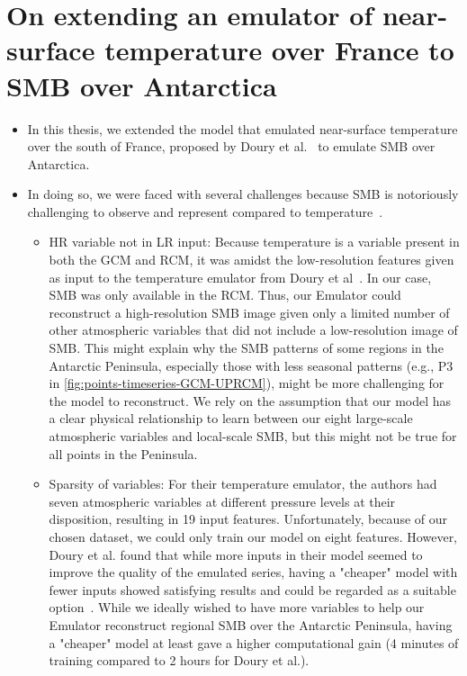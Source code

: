 \documentclass[a4paper,11pt,oneside]{report}
\begin{document}
\section{On extending an emulator of near-surface temperature over France to SMB over Antarctica}\label{sec:extension-doury}
\begin{itemize}
    \item In this thesis, we extended the model that emulated near-surface temperature over the south of France, proposed by Doury et al.~\cite{Doury} to emulate SMB over Antarctica. 
    \item In doing so, we were faced with several challenges because SMB is notoriously challenging to observe and represent compared to temperature~\cite{Lenaerts2019}. 
    \begin{itemize}
        \item HR variable not in LR input: Because temperature is a variable present in both the GCM and RCM, it was amidst the low-resolution features given as input to the temperature emulator from Doury et al~\cite{Doury}. In our case, SMB was only available in the RCM. Thus, our Emulator could reconstruct a high-resolution SMB image given only a limited number of other atmospheric variables that did not include a low-resolution image of SMB. This might explain why the SMB patterns of some regions in the Antarctic Peninsula, especially those with less seasonal patterns (e.g., P3 in \autoref{fig:points-timeseries-GCM-UPRCM}), might be more challenging for the model to reconstruct. We rely on the assumption that our model has a clear physical relationship to learn between our eight large-scale atmospheric variables and local-scale SMB, but this might not be true for all points in the Peninsula. 
        \item Sparsity of variables: For their temperature emulator, the authors had seven atmospheric variables at different pressure levels at their disposition, resulting in 19 input features. Unfortunately, because of our chosen dataset, we could only train our model on eight features. However, Doury et al. found that while more inputs in their model seemed to improve the quality of the emulated series, having a "cheaper" model with fewer inputs showed satisfying results and could be regarded as a suitable option~\cite{Doury}. While we ideally wished to have more variables to help our Emulator reconstruct regional SMB over the Antarctic Peninsula, having a "cheaper" model at least gave a higher computational gain (4 minutes of training compared to 2 hours for Doury et al.).  

\end{itemize}
\end{itemize}
\end{document}

